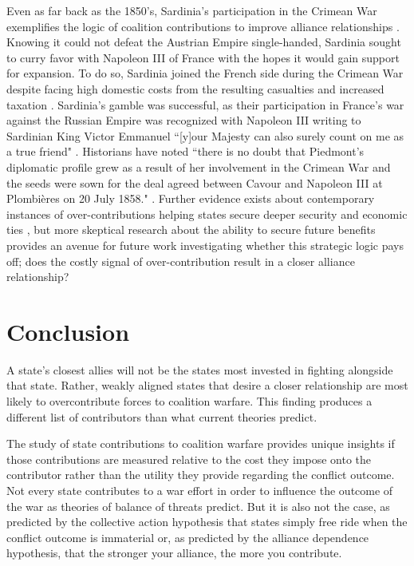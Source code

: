 \documentclass[12pt,letterpaper]{article}
\begin{document}
	Even as far back as the 1850's, Sardinia's participation in the Crimean War exemplifies the logic of coalition contributions to improve alliance relationships \citep[17-25]{blumberg_carefullyplannedaccident_1990}. Knowing it could not defeat the Austrian Empire single-handed, Sardinia sought to curry favor with Napoleon III of France with the hopes it would gain support for expansion. To do so, Sardinia joined the French side during the Crimean War despite facing high domestic costs from the resulting casualties and increased taxation \citep[326]{gorce_histoiresecondempire_1902}. Sardinia's gamble was successful, as their participation in France's war against the Russian Empire was recognized with Napoleon III writing to Sardinian King Victor Emmanuel ``[y]our Majesty can also surely count on me as a true friend" \citep[1]{boselli_napoleoniiivictor_1926}. Historians have noted ``there is no doubt that Piedmont's diplomatic profile grew as a result of her involvement in the Crimean War and the seeds were sown for the deal agreed between Cavour and Napoleon III at Plombi\`{e}res on 20 July 1858." \citep{rathbone_piedmont1850s_2008}. Further evidence exists about contemporary instances of over-contributions helping states secure deeper security \citep{slavin_buildswarcoalition_2003} and economic ties \citep{whitmore_uswarallies_2003}, but more skeptical research about the ability to secure future benefits \citep{porter_lastchargeknights_2010} provides an avenue for future work investigating whether this strategic logic pays off; does the costly signal of over-contribution result in a closer alliance relationship?

\section{Conclusion}
	A state's closest allies will not be the states most invested in fighting alongside that state. Rather, weakly aligned states that desire a closer relationship are most likely to overcontribute forces to coalition warfare. This finding produces a different list of contributors than what current theories predict.
	
	The study of state contributions to coalition warfare provides unique insights if those contributions are measured relative to the cost they impose onto the contributor rather than the utility they provide regarding the conflict outcome. Not every state contributes to a war effort in order to influence the outcome of the war as theories of balance of threats predict. But it is also not the case, as predicted by the collective action hypothesis that states simply free ride when the conflict outcome is immaterial or, as predicted by the alliance dependence hypothesis, that the stronger your alliance, the more you contribute.
\end{document}
